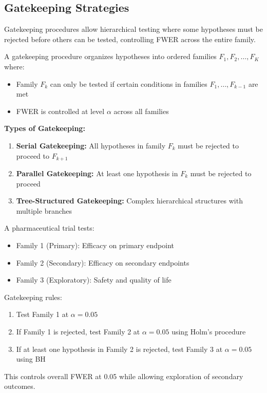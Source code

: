 \subsection{Gatekeeping Strategies}

Gatekeeping procedures allow hierarchical testing where some hypotheses must be rejected before others can be tested, controlling FWER across the entire family.

\begin{definition}
A gatekeeping procedure organizes hypotheses into ordered families $F_1, F_2, \ldots, F_K$ where:
\begin{itemize}
    \item Family $F_k$ can only be tested if certain conditions in families $F_1, \ldots, F_{k-1}$ are met
    \item FWER is controlled at level $\alpha$ across all families
\end{itemize}
\end{definition}

\textbf{Types of Gatekeeping:}

\begin{enumerate}
    \item \textbf{Serial Gatekeeping:} All hypotheses in family $F_k$ must be rejected to proceed to $F_{k+1}$

    \item \textbf{Parallel Gatekeeping:} At least one hypothesis in $F_k$ must be rejected to proceed

    \item \textbf{Tree-Structured Gatekeeping:} Complex hierarchical structures with multiple branches
\end{enumerate}

\begin{example}
A pharmaceutical trial tests:
\begin{itemize}
    \item Family 1 (Primary): Efficacy on primary endpoint
    \item Family 2 (Secondary): Efficacy on secondary endpoints
    \item Family 3 (Exploratory): Safety and quality of life
\end{itemize}

Gatekeeping rules:
\begin{enumerate}
    \item Test Family 1 at $\alpha = 0.05$
    \item If Family 1 is rejected, test Family 2 at $\alpha = 0.05$ using Holm's procedure
    \item If at least one hypothesis in Family 2 is rejected, test Family 3 at $\alpha = 0.05$ using BH
\end{enumerate}

This controls overall FWER at 0.05 while allowing exploration of secondary outcomes.
\end{example}

